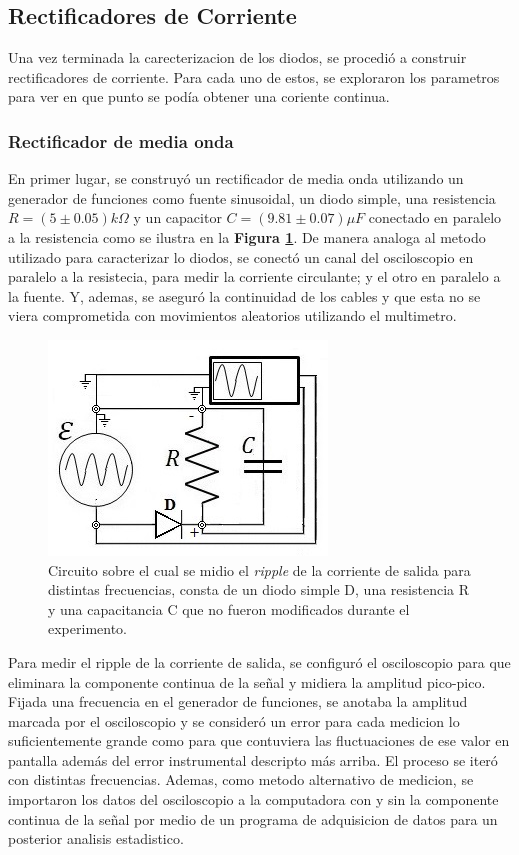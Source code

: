 \documentclass[11pt,a4paper]{article}
\begin{document}
\subsection{Rectificadores de Corriente}
Una vez terminada la carecterizacion de los diodos, se procedió a construir rectificadores de corriente. Para cada uno de estos, se exploraron los parametros para ver en que punto se podía obtener una coriente continua.

\subsubsection{Rectificador de media onda}
En primer lugar, se construyó un rectificador de media onda utilizando un generador de funciones como fuente sinusoidal, un diodo simple, una resistencia $R = (5 \pm 0.05)k\Omega$ y un capacitor $C = (9.81 \pm 0.07)\mu F$ conectado en paralelo a la resistencia como se ilustra en la \textbf{Figura \ref{fig:Re-M-O}}. De manera analoga al metodo utilizado para caracterizar lo diodos, se conectó un canal del osciloscopio en paralelo a la resistecia, para medir la corriente circulante; y el otro en paralelo a la fuente. Y, ademas, se aseguró la continuidad de los cables y que esta no se viera comprometida con movimientos aleatorios utilizando el multimetro.

\begin{figure}[H]
\centering
\includegraphics[scale=0.8]{Rectificador-Media-Onda}
   \caption{Circuito sobre el cual se midio el \textit{ripple} de la corriente de salida para distintas frecuencias, consta de un diodo simple D, una resistencia R y una capacitancia C que no fueron modificados durante el experimento. }
   \label{fig:Re-M-O}
\end{figure}

Para medir el ripple de la corriente de salida, se configuró el osciloscopio para que eliminara la componente continua de la señal y midiera la amplitud pico-pico. Fijada una frecuencia en el generador de funciones, se anotaba la amplitud marcada por el osciloscopio y se consideró un error para cada medicion lo suficientemente grande como para que contuviera las fluctuaciones de ese valor en pantalla además del error instrumental descripto más arriba. El proceso se iteró con distintas frecuencias.  Ademas, como metodo alternativo de medicion, se importaron los datos del osciloscopio a la computadora con y sin la componente continua de la señal por medio de un programa de adquisicion de datos para un posterior analisis estadistico.
\end{document}
